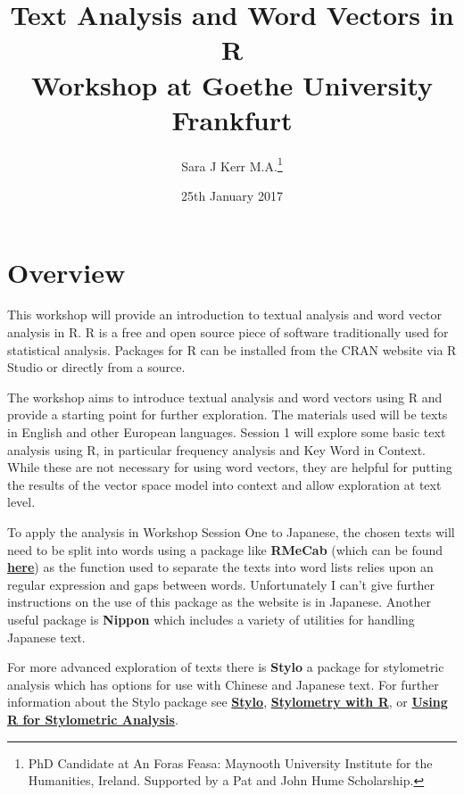 \documentclass[12pt]{article}
\title{{Text Analysis and Word Vectors in R} \\ {Workshop at Goethe University Frankfurt}  \newline }
\author{Sara J Kerr M.A.\thanks{PhD Candidate at An Foras Feasa: Maynooth University Institute for the Humanities, Ireland. \newline Supported by a Pat and John Hume Scholarship.}}
\date{25th January 2017}
\begin{document}
\setlength{\parindent}{0pt}
\setlength{\parskip}{1em}

\begin{titlepage}
\maketitle
\end{titlepage}

\tableofcontents

\section*{Overview}
This workshop will provide an introduction to textual analysis and word vector analysis in R.  R is a free and open source piece of software traditionally used for statistical analysis. Packages for R can be installed from the CRAN website via R Studio or directly from a source.

The workshop aims to introduce textual analysis and word vectors using R and provide a starting point for further exploration. The materials used will be texts in English and other European languages. Session 1 will explore some basic text analysis using R, in particular frequency analysis and Key Word in Context. While these are not necessary for using word vectors, they are helpful for putting the results of the vector space model into context and allow exploration at text level.

To apply the analysis in Workshop Session One to Japanese, the chosen texts will need to be split into words using a package like \textbf{RMeCab} (which can be found \href{http://rmecab.jp/wiki/index.php?RMeCab}{\textbf{here}}) as the function used to separate the texts into word lists relies upon an regular expression and gaps between words. Unfortunately I can't give further instructions on the use of this package as the website is in Japanese. Another useful package is \textbf{Nippon} which includes a variety of utilities for handling Japanese text. 

For more advanced exploration of texts there is \textbf{Stylo} a package for stylometric analysis which has options for use with Chinese and Japanese text. For further information about the Stylo package see \href{https://cran.r-project.org/web/packages/stylo/stylo.pdf}{\textbf{Stylo}}, \href{https://journal.r-project.org/archive/accepted/eder-rybicki-kestemont.pdf}{\textbf{Stylometry with R}}, or \href{https://my.vanderbilt.edu/digitalhumanities/using-r-for-stylometric-analysis-with-the-stylo-package/}{\textbf{Using R for Stylometric Analysis}}.
\end{document}
